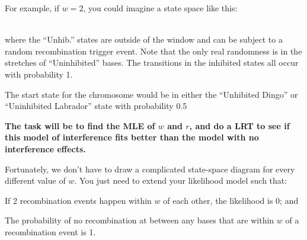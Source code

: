 \documentclass[11pt]{article}
\begin{document}
For example, if $w=2$, you could imagine a state space like this:\\
\\
where the ``Unhib.'' states are outside of the window and can
be subject to a random recombination trigger event.
Note that the only real randomness is in the stretches of
    ``Uninhibited'' bases.
The transitions in the inhibited states all occur with probability 1.

The start state for the chromosome would be in either 
    the ``Unhibited Dingo'' or
    ``Uninhibited Labrador'' state with probability 0.5 

{\bf The task will be to find the MLE of $w$ and $r$, and do a LRT
    to see if this model of interference fits better than
    the model with no interference effects.
}

Fortunately, we don't have to draw a complicated state-space 
    diagram for every different value of $w$.
You just need to extend your likelihood model such that:
\begin{compactenum}
    \item If 2 recombination events happen within $w$ of each
        other, the likelihood is 0; and
    \item The probability of no recombination at between
        any bases that are within $w$ of a recombination event
        is 1.
\end{compactenum}
\end{document}
